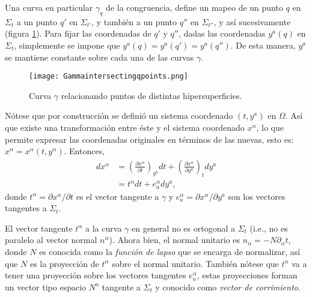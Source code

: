 Una curva en particular $\gamma_{q}$ de la congruencia, define un mapeo de un punto $q$ en $\Sigma_{t}$ a un punto $q'$ en $\Sigma_{t'}$, y tambi\'{e}n a un punto $q''$ en $\Sigma_{t''}$, y as\'{i} sucesivamente (figura \ref{fig:curvagamma}). Para fijar las coordenadas de $q'$ y $q''$, dadas las coordenadas $y^{a}(q)$ en $\Sigma_{t}$, simplemente se impone que $y^{a}(q) = y^{a}(q') = y^{a}(q'')$. De esta manera, $y^{a}$ se mantiene constante sobre cada una de las curvas $\gamma$.

\begin{figure}[H]
\centering
\texttt{[image: Gammaintersectingqpoints.png]}
\caption{Curva $\gamma$ relacionando puntos de distintas hipersuperficies.}\label{fig:curvagamma}
\end{figure}

N\'{o}tese que por construcci\'{o}n se defini\'{o} un sistema coordenado $(t, y^{a})$ en $\Omega$. As\'{i} que existe una transformaci\'{o}n entre \'{e}ste y el sistema coordenado $x^{\alpha}$, lo que permite expresar las coordenadas originales en t\'{e}rminos de las nuevas, esto es: $x^{\alpha} = x^{\alpha} (t, y^{\alpha})$. Entonces,
%
\begin{align}
\label{eq:dxalpha}
dx^{\alpha} & = \left( \frac{\partial x^{\alpha}}{\partial t} \right)_{y^{a}} dt + \left( \frac{\partial x^{\alpha}}{\partial y^{a}} \right)_{t} dy^{a} \nonumber \\
& = t^{\alpha} dt + e^{\alpha}_{a} dy^{a},
\end{align}
%
donde $t^{\alpha}=\partial x^{\alpha}/\partial t$ es el vector tangente a $\gamma$ y $e^{\alpha}_{a}=\partial x^{\alpha}/\partial y^{a}$ son los vectores tangentes a $\Sigma_{t}$.

El vector tangente $t^{\alpha}$ a la curva $\gamma$ en general no es ortogonal a $\Sigma_{t}$ (i.e., no es paralelo al vector normal $n^{\alpha}$). Ahora bien, el normal unitario es $n_{\alpha} = -N \partial_{\alpha} t$, donde $N$ es conocida como la \emph{funci\'{o}n de lapso} que se encarga de normalizar, as\'{i} que $N$ es la proyecci\'{o}n de $t^{\alpha}$ sobre el normal unitario\footnotemark. Tambi\'{e}n n\'{o}tese que $t^{\alpha}$ va a tener una proyecci\'{o}n sobre los vectores tangentes $e^{\alpha}_{a}$, estas proyecciones forman un vector tipo espacio $N^{a}$ tangente a $\Sigma_{t}$ y conocido como \emph{vector de corrimiento}.

